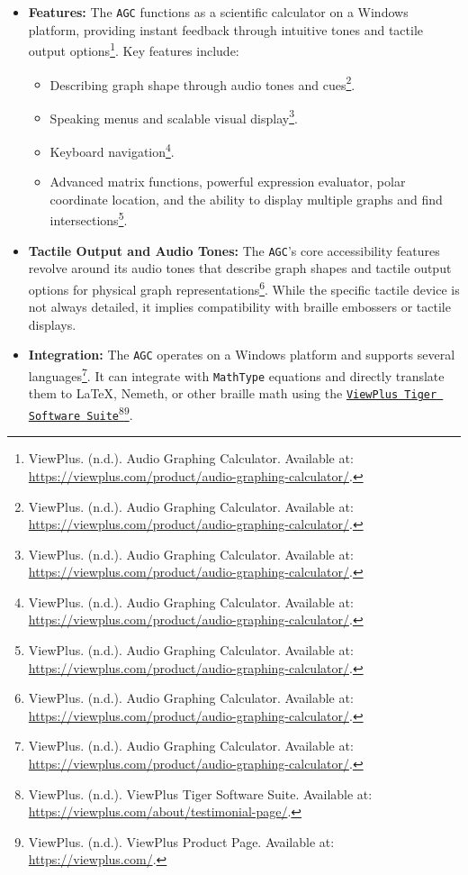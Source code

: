 \begin{itemize}
    \item \textbf{Features:} The \texttt{AGC} functions as a scientific calculator on a Windows platform, providing instant feedback through intuitive tones and tactile output options\footnote{ViewPlus. (n.d.). Audio Graphing Calculator. Available at: \url{https://viewplus.com/product/audio-graphing-calculator/}.}. Key features include:

    \begin{itemize}
        \item Describing graph shape through audio tones and cues\footnote{ViewPlus. (n.d.). Audio Graphing Calculator. Available at: \url{https://viewplus.com/product/audio-graphing-calculator/}.}.
        \item Speaking menus and scalable visual display\footnote{ViewPlus. (n.d.). Audio Graphing Calculator. Available at: \url{https://viewplus.com/product/audio-graphing-calculator/}.}.
        \item Keyboard navigation\footnote{ViewPlus. (n.d.). Audio Graphing Calculator. Available at: \url{https://viewplus.com/product/audio-graphing-calculator/}.}.
        \item Advanced matrix functions, powerful expression evaluator, polar coordinate location, and the ability to display multiple graphs and find intersections\footnote{ViewPlus. (n.d.). Audio Graphing Calculator. Available at: \url{https://viewplus.com/product/audio-graphing-calculator/}.}.
    \end{itemize}

    \item \textbf{Tactile Output and Audio Tones:} The \texttt{AGC}'s core accessibility features revolve around its audio tones that describe graph shapes and tactile output options for physical graph representations\footnote{ViewPlus. (n.d.). Audio Graphing Calculator. Available at: \url{https://viewplus.com/product/audio-graphing-calculator/}.}. While the specific tactile device is not always detailed, it implies compatibility with braille embossers or tactile displays.

    \item \textbf{Integration:} The \texttt{AGC} operates on a Windows platform and supports several languages\footnote{ViewPlus. (n.d.). Audio Graphing Calculator. Available at: \url{https://viewplus.com/product/audio-graphing-calculator/}.}. It can integrate with \texttt{MathType} equations and directly translate them to LaTeX, Nemeth, or other braille math using the \href{https://viewplus.com/about/testimonial-page/}{\texttt{ViewPlus Tiger Software Suite}}\footnote{ViewPlus. (n.d.). ViewPlus Tiger Software Suite. Available at: \url{https://viewplus.com/about/testimonial-page/}.}\footnote{ViewPlus. (n.d.). ViewPlus Product Page. Available at: \url{https://viewplus.com/}.}.
\end{itemize}

